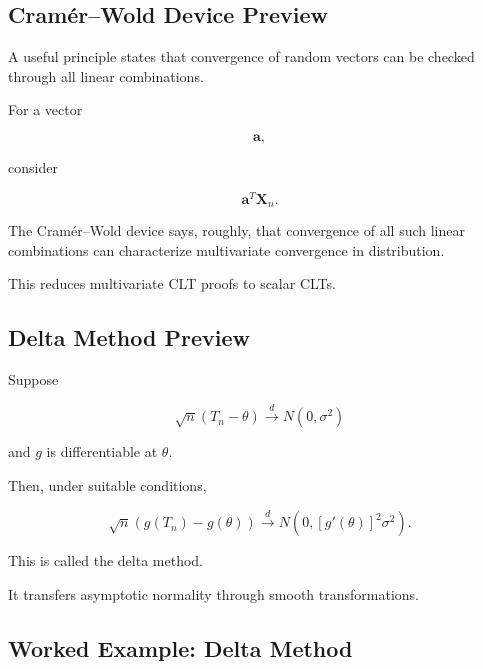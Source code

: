 \subsection{Cramér--Wold Device Preview}
\label{subsec:cramer-wold-preview}

A useful principle states that convergence of random vectors can be
checked through all linear combinations.

For a vector

\[
\mathbf{a},
\]

consider

\[
\mathbf{a}^T
\mathbf{X}_n.
\]

The Cramér--Wold device says, roughly, that convergence of all such
linear combinations can characterize multivariate convergence in
distribution.

This reduces multivariate CLT proofs to scalar CLTs.

\subsection{Delta Method Preview}
\label{subsec:delta-method-preview}

Suppose

\[
\sqrt{n}
(T_n-\theta)
\xrightarrow{d}
N(0,\sigma^2)
\]

and \(g\) is differentiable at \(\theta\).

Then, under suitable conditions,

\[
\boxed{
\sqrt{n}
\left(
g(T_n)-g(\theta)
\right)
\xrightarrow{d}
N
\left(
0,
[g'(\theta)]^2\sigma^2
\right).
}
\]

This is called the delta method.

It transfers asymptotic normality through smooth transformations.

\subsection{Worked Example: Delta Method}
\label{subsec:worked-delta-method}

